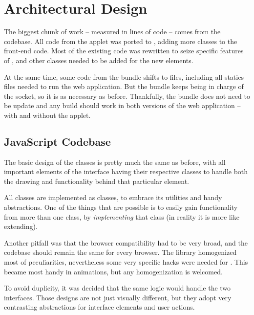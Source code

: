 \section{Architectural Design} %
\label{sec:architectural_design}

The biggest chunk of work -- measured in lines of code -- comes from the  codebase.
All code from the  applet was ported to , adding more classes to the front-end code.
Most of the existing code was rewritten to seize specific features of , and other classes needed to be added for the new elements.

At the same time, some code from the  bundle shifts to  files, including all statics files needed to run the web application.
But the  bundle keeps being in charge of the  socket, so it is as necessary as before.
Thankfully, the bundle does not need to be update and any build should work in both versions of the web application -- with and without the applet.

\subsection{JavaScript Codebase} %
\label{sub:javascript_codebase}

The basic design of the classes is pretty much the same as before, with all important elements of the interface having their respective classes to handle both the drawing and functionality behind that particular element.

All classes are implemented as  classes, to embrace its utilities and handy abstractions.
One of the things that are possible is to easily gain functionality from more than one class, by \emph{implementing} that  class (in reality it is more like extending).

Another pitfall was that the browser compatibility had to be very broad, and the codebase should remain the same for every browser.
The  library homogenized most of peculiarities, nevertheless some very specific hacks were needed for .
This became most handy in animations, but any  homogenization is welcomed.

To avoid duplicity, it was decided that the same  logic would handle the two interfaces.
Those designs are not just visually different, but they adopt very contrasting abstractions for interface elements and user actions.

